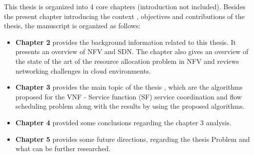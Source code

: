This thesis is organized into 4 core chapters (introduction
 not included). Besides the present chapter introducing the context
 , objectives and contributions of the thesis, the manuscript is organized as
follows:

\begin{itemize}
\item \textbf{Chapter 2} provides the background information related to this thesis. It presents an
overview of NFV and SDN. The chapter also gives an overview of the state of the
art of the resource allocation problem in NFV and reviews networking challenges in
cloud environments.

\item \textbf{Chapter 3} provides the main topic of the thesis , which are the algorithms proposed for the VNF - Service function (SF) service coordination and flow scheduling problem along with the results by using the proposed algorithms.

\item \textbf{Chapter 4} provided some conclusions regarding the chapter 3 analysis.

\item \textbf{Chapter 5} provides some future directions, regarding the thesis Problem and what can be further researched.
\end{itemize}